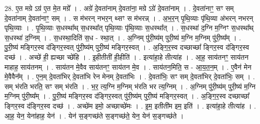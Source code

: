 \documentclass[17pt]{extarticle}
\begin{document}
28. ए॒त मग्रे ऽग्र॑ ए॒त मे॒त मग्रे᳚ । . अग्रे॑ दे॒वता॑नाम् दे॒वता॑ना॒ मग्रे ऽग्रे॑ दे॒वता॑नाम् । . दे॒वता॑नाꣳ॒॒ सꣳ सम् दे॒वता॑नाम् दे॒वता॑नाꣳ॒॒ सम् । . स म॑भरन् नभर॒न् थ्सꣳ स म॑भरन्न् । . अ॒भ॒र॒न् पृ॒थि॒व्याः पृ॑थि॒व्या अ॑भरन् नभरन् पृथि॒व्याः । . पृ॒थि॒व्याः स॒धस्था᳚थ् स॒धस्था᳚त् पृथि॒व्याः पृ॑थि॒व्याः स॒धस्था᳚त् । . स॒धस्था॑ द॒ग्नि म॒ग्निꣳ स॒धस्था᳚थ् स॒धस्था॑ द॒ग्निम् । . स॒धस्था॒दिति॑ स॒ध - स्था॒त् । . अ॒ग्निम् पु॑री॒ष्य॑म् पुरी॒ष्य॑ म॒ग्नि म॒ग्निम् पु॑री॒ष्य᳚म् । . पु॒री॒ष्य॑ मङ्गिर॒स्व द॑ङ्गिर॒स्वत् पु॑री॒ष्य॑म् पुरी॒ष्य॑ मङ्गिर॒स्वत् । . अ॒ङ्गि॒र॒स्व दच्छाच्छा᳚ ङ्गिर॒स्व द॑ङ्गिर॒स्व दच्छ॑ । . अच्छे॑ ही॒ ह्यच्छा च्छे॑हि । . इ॒हीतीती॑ ही॒हीति॑ । . इत्या॑हा॒हे तीत्या॑ह । . आ॒ह॒ साय॑तनꣳ॒॒ साय॑तन माहाह॒ साय॑तनम् । . साय॑तन मे॒वैव साय॑तनꣳ॒॒ साय॑तन मे॒व । . साय॑तन॒मिति॒ स - आ॒य॒त॒न॒म् । . ए॒वैन॑ मेन मे॒वैवैन᳚म् । . ए॒न॒म् दे॒वता॑भिर् दे॒वता॑भि रेन मेनम् दे॒वता॑भिः । . दे॒वता॑भिः॒ सꣳ सम् दे॒वता॑भिर् दे॒वता॑भिः॒ सम् । . सम् भ॑रति भरति॒ सꣳ सम् भ॑रति । . भ॒र॒ त्य॒ग्नि म॒ग्निम् भ॑रति भर त्य॒ग्निम् । . अ॒ग्निम् पु॑री॒ष्य॑म् पुरी॒ष्य॑ म॒ग्नि म॒ग्निम् पु॑री॒ष्य᳚म् । . पु॒री॒ष्य॑ मङ्गिर॒स्व द॑ङ्गिर॒स्वत् पु॑री॒ष्य॑म् पुरी॒ष्य॑ मङ्गिर॒स्वत् । . अ॒ङ्गि॒र॒स्व दच्छाच्छा᳚ ङ्गिर॒स्व द॑ङ्गिर॒स्व दच्छ॑ । . अच्छे॑म इमो॒ अच्छाच्छे॑मः । . इ॒म॒ इतीती॑म इम॒ इति॑ । . इत्या॑हा॒हे तीत्या॑ह । . आ॒ह॒ येन॒ येना॑हाह॒ येन॑ । . येन॑ स॒ङ्गच्छ॑ते स॒ङ्गच्छ॑ते॒ येन॒ येन॑ स॒ङ्गच्छ॑ते । \newline
\end{document}
